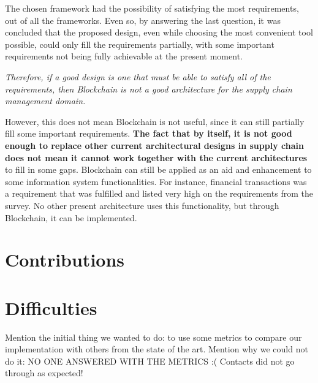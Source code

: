 \par The chosen framework had the possibility of satisfying the most requirements, out of all the frameworks. Even so, by answering the last question, it was concluded that the proposed design, even while choosing the most convenient tool possible, could only fill the requirements partially, with some important requirements not being fully achievable at the present moment.


\emph{Therefore, if a good design is one that must be able to satisfy all of the requirements, then Blockchain is not a good architecture for the supply chain management domain.}


However, this does not mean Blockchain is not useful, since it can still partially fill some important requirements. \textbf{The fact that by itself, it is not good enough to replace other current architectural designs in supply chain does not mean it cannot work together with the current architectures} to fill in some gaps. Blockchain can still be applied as an aid and enhancement to some information system functionalities. For instance, financial transactions was a requirement that was fulfilled and listed very high on the requirements from the survey. No other present architecture uses this functionality, but through Blockchain, it can be implemented.



\section{Contributions}


\section{Difficulties}
Mention the initial thing we wanted to do: to use some metrics to compare our implementation with others from the state of the art.
Mention why we could not do it: NO ONE ANSWERED WITH THE METRICS :( Contacts did not go through as expected!


